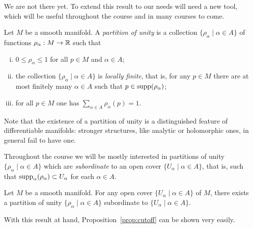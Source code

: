 We are not there yet. To extend this result to our needs will need a new tool, which will be useful throughout the course and in many courses to come.

\begin{definition}
  Let $M$ be a smooth manifold. A \emph{partition of unity} is a collection $\{\rho_\alpha \mid \alpha\in A\}$ of functions $\rho_\alpha:M\to\mathbb{R}$ such that
  \begin{enumerate}[(i)]
    \item $0 \leq \rho_\alpha \leq 1$ for all $p\in M$ and $\alpha\in A$;
    \item\label{def:pou.2} the collection $\{\rho_\alpha \mid \alpha\in A\}$ is \emph{locally finite}, that is, for any $p\in M$ there are at most finitely many $\alpha\in A$ such that $p\in\operatorname{supp}(\rho_\alpha)$;
    \item for all $p\in M$ one has $\sum_{\alpha\in A} \rho_\alpha(p) = 1$.
  \end{enumerate}
\end{definition}

\begin{remark}
Note that the existence of a partition of unity is a distinguished feature of differentiable manifolds: stronger structures, like analytic or holomorphic ones, in general fail to have one.
\end{remark}

Throughout the course we will be mostly interested in partitions of unity $\{\rho_\alpha \mid \alpha\in A\}$ which are \emph{subordinate} to an open cover $\{U_\alpha\mid\alpha\in A\}$, that is, such that $\operatorname{supp}_\alpha(\rho_\alpha) \subset U_\alpha$ for each $\alpha\in A$.

\begin{theorem}\label{thm:partitionof1}
  Let $M$ be a smooth manifold. For any open cover $\{U_\alpha\mid\alpha\in A\}$ of $M$, there exists a partition of unity $\{\rho_\alpha \mid \alpha\in A\}$ subordinate to $\{U_\alpha\mid\alpha\in A\}$.
\end{theorem}

With this result at hand, Proposition~\ref{prop:cutoff} can be shown very easily.

